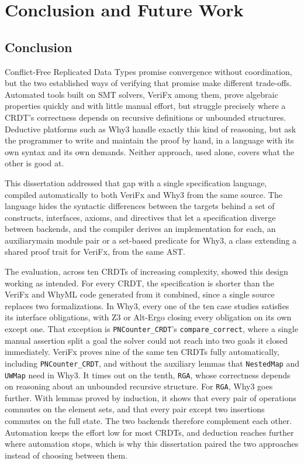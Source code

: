 
%

\chapter{Conclusion and Future Work}
\label{cha:conclusion}

\section{Conclusion}
\label{sec:conclusion}

Conflict-Free Replicated Data Types promise convergence without coordination, but the two established ways of verifying
that promise make different trade-offs. Automated tools built on SMT solvers, VeriFx among them, prove algebraic properties
quickly and with little manual effort, but struggle precisely where a CRDT's correctness depends on recursive definitions
or unbounded structures. Deductive platforms such as Why3 handle exactly this kind of reasoning, but ask the programmer
to write and maintain the proof by hand, in a language with its own syntax and its own demands. Neither approach, used
alone, covers what the other is good at.

This dissertation addressed that gap with a single specification language, compiled automatically to both VeriFx and Why3
from the same source. The language hides the syntactic differences between the targets behind a set of constructs,
interfaces, axioms, and directives that let a specification diverge between backends, and
the compiler derives an implementation for each, an auxiliary\/main module pair or a set-based predicate for
Why3, a class extending a shared proof trait for VeriFx, from the same AST.

The evaluation, across ten CRDTs of increasing complexity, showed this design working as intended. For every CRDT, the
specification is shorter than the VeriFx and WhyML code generated from it combined, since a single source replaces two
formalizations. In Why3, every one of the ten case studies satisfies its interface obligations, with Z3 or Alt-Ergo closing every
obligation on its own except one. That exception is \texttt{PNCounter\_CRDT}'s \texttt{compare\_correct}, where a single
manual assertion split a goal the solver could not reach into two goals it closed immediately. VeriFx proves nine of the
same ten CRDTs fully automatically, including \texttt{PNCounter\_CRDT}, and without the auxiliary lemmas that
\texttt{NestedMap} and \texttt{UWMap} need in Why3. It times out on the tenth, \texttt{RGA}, whose correctness depends on
reasoning about an unbounded recursive structure. For \texttt{RGA}, Why3 goes further. With lemmas proved by induction, it
shows that every pair of operations commutes on the element sets, and that every pair except two insertions commutes on
the full state. The two backends therefore complement each other. Automation keeps the effort low for most CRDTs, and
deduction reaches further where automation stops, which is why this dissertation paired the two approaches instead of
choosing between them.

